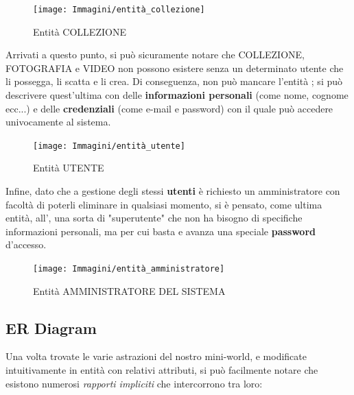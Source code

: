 \documentclass[a4paper]{article}
\begin{document}
	\begin{figure}[H]
        \begin{center}
            \texttt{[image: Immagini/entità\_collezione]}
            \caption{Entità COLLEZIONE}
        \end{center}
	\end{figure}

	\vspace{10pt}
	Arrivati a questo punto, si può sicuramente notare che
	COLLEZIONE,
	FOTOGRAFIA e
	VIDEO non possono esistere senza un determinato utente
	che li
	possegga, li scatta e li crea. Di conseguenza,
	non può mancare l'entità ;
	si può descrivere quest'ultima con delle \textbf{informazioni
	personali}
	(come nome, cognome ecc...) e delle \textbf{credenziali}
	(come
	e-mail e password) con il quale può accedere univocamente
	al sistema.

	\begin{figure}[H]
        \begin{center}
            \texttt{[image: Immagini/entità\_utente]}
            \caption{Entità UTENTE}
        \end{center}
	\end{figure}

	\vspace{10pt}
	Infine, dato che a gestione degli stessi \textbf{utenti}
	è
	richiesto un
	amministratore con facoltà di poterli eliminare in
	qualsiasi momento, si è pensato, come
	ultima entità, all',
	una
	sorta
	di
	"superutente" che non ha bisogno di specifiche
	informazioni personali, ma per cui basta e
	avanza una speciale \textbf{password} d'accesso.
	
	\begin{figure}[H]
        \begin{center}
            \texttt{[image: Immagini/entità\_amministratore]}
            \caption{Entità AMMINISTRATORE DEL SISTEMA}
        \end{center}
	\end{figure}



	\vspace{35pt}
	\subsection{ER Diagram}
	\vspace{8pt}
	Una volta trovate le varie astrazioni del nostro 
	mini-world, e modificate intuitivamente in entità
	con relativi attributi, si può facilmente notare che
	esistono numerosi\emph{ rapporti impliciti} che
	intercorrono tra loro:
\end{document}
